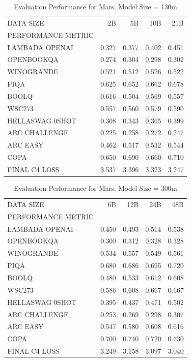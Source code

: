 \begin{table}
[H] \centering \caption{Evaluation Performance for Mars, Model Size = 130m}
\label{tab:eval-performance-mars-130M}
\begin{tabular}{lrrrr}
\toprule
DATA SIZE & 2B & 5B & 10B & 21B \\
PERFORMANCE METRIC &  &  &  &  \\
\midrule
LAMBADA OPENAI & 0.327 & 0.377 & 0.402 & 0.451 \\
OPENBOOKQA & 0.274 & 0.304 & 0.298 & 0.302 \\
WINOGRANDE & 0.521 & 0.512 & 0.526 & 0.522 \\
PIQA & 0.625 & 0.652 & 0.662 & 0.678 \\
BOOLQ & 0.616 & 0.504 & 0.569 & 0.557 \\
WSC273 & 0.557 & 0.560 & 0.579 & 0.590 \\
HELLASWAG 0SHOT & 0.308 & 0.343 & 0.365 & 0.399 \\
ARC CHALLENGE & 0.225 & 0.258 & 0.272 & 0.247 \\
ARC EASY & 0.462 & 0.517 & 0.532 & 0.544 \\
COPA & 0.650 & 0.690 & 0.660 & 0.710 \\
FINAL C4 LOSS & 3.537 & 3.396 & 3.323 & 3.247 \\
\bottomrule
\end{tabular}
\end{table}


\begin{table}
[H] \centering \caption{Evaluation Performance for Mars, Model Size = 300m}
\label{tab:eval-performance-mars-300M}
\begin{tabular}{lrrrr}
\toprule
DATA SIZE & 6B & 12B & 24B & 48B \\
PERFORMANCE METRIC &  &  &  &  \\
\midrule
LAMBADA OPENAI & 0.450 & 0.493 & 0.514 & 0.538 \\
OPENBOOKQA & 0.300 & 0.312 & 0.328 & 0.328 \\
WINOGRANDE & 0.534 & 0.557 & 0.549 & 0.561 \\
PIQA & 0.680 & 0.686 & 0.695 & 0.720 \\
BOOLQ & 0.480 & 0.533 & 0.612 & 0.608 \\
WSC273 & 0.586 & 0.608 & 0.667 & 0.667 \\
HELLASWAG 0SHOT & 0.395 & 0.437 & 0.471 & 0.502 \\
ARC CHALLENGE & 0.253 & 0.269 & 0.298 & 0.307 \\
ARC EASY & 0.547 & 0.580 & 0.608 & 0.616 \\
COPA & 0.700 & 0.740 & 0.720 & 0.730 \\
FINAL C4 LOSS & 3.249 & 3.158 & 3.097 & 3.040 \\
\bottomrule
\end{tabular}
\end{table}


